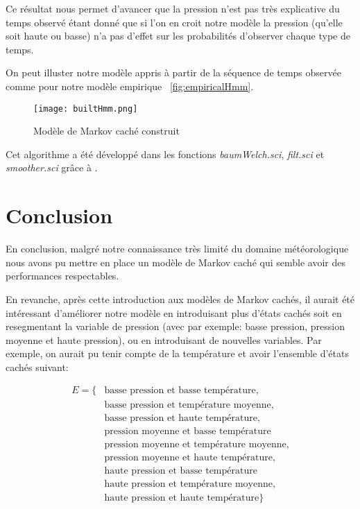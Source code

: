\documentclass{article}
\begin{document}
\begin{multicols}{2}
Ce résultat nous permet d'avancer que la pression n'est pas très explicative du
temps observé étant donné que si l'on en croit notre modèle la pression (qu'elle
soit haute ou basse) n'a pas d'effet sur les probabilités d'observer chaque type
de temps.

On peut illuster notre modèle appris à partir de la séquence de temps observée
comme pour notre modèle empirique ~\ref{fig:empiricalHmm}.

\begin{figure}[H]
    \begin{center}
        \texttt{[image: builtHmm.png]}
        \centering
        \captionsetup{justification=centering}
        \caption{\label{fig:builtHmm}Modèle de Markov caché construit}
    \end{center}
\end{figure}

Cet algorithme a été développé dans les fonctions \emph{baumWelch.sci},
\emph{filt.sci} et \emph{smoother.sci} grâce à \cite{garivier}.


\section{Conclusion}\label{sec:conclu}

En conclusion, malgré notre connaissance très limité du domaine météorologique
nous avons pu mettre en place un modèle de Markov caché qui semble avoir des
performances respectables.

En revanche, après cette introduction aux modèles de Markov cachés, il aurait
été intéressant d'améliorer notre modèle en introduisant plus d'états cachés
soit en resegmentant la variable de pression (avec par exemple: basse pression,
pression moyenne et haute pression), ou en introduisant de nouvelles variables.
Par exemple, on aurait pu tenir compte de la température et avoir l'ensemble
d'états cachés suivant:

\begin{equation}
    \begin{split}
        E = \{&\text{basse pression et basse température}, \\
        & \text{basse pression et température moyenne},   \\
        & \text{basse pression et haute température},     \\
        & \text{pression moyenne et basse température}    \\
        & \text{pression moyenne et température moyenne}, \\
        & \text{pression moyenne et haute température},   \\
        & \text{haute pression et basse température}      \\
        & \text{haute pression et température moyenne},   \\
        & \text{haute pression et haute température}\}     \\
    \end{split}
\end{equation}


\end{multicols}
\end{document}
